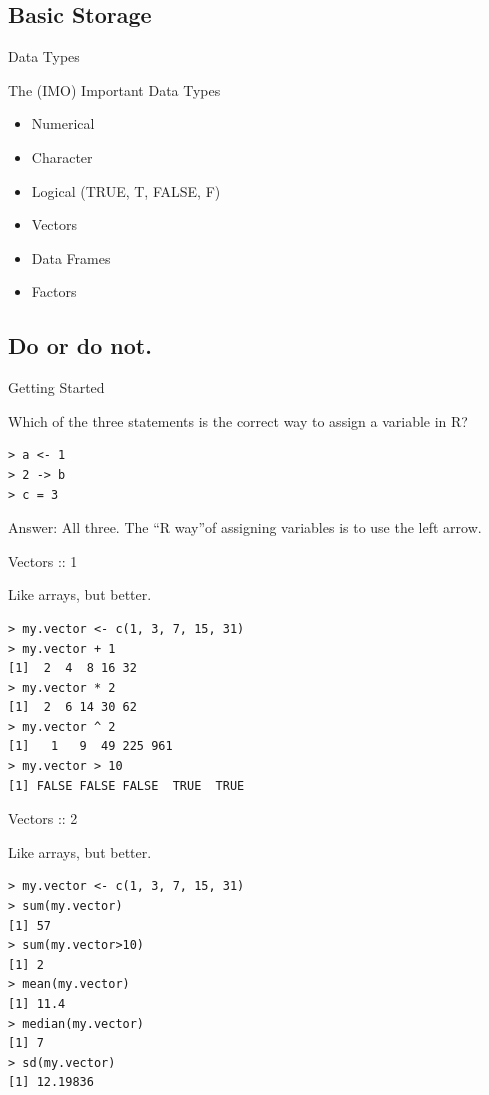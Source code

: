\documentclass{beamer}
\begin{document}
\subsection{Basic Storage}

\begin{frame}{Data Types}

     The (IMO) Important Data Types

     \begin{itemize}
        \item Numerical
        \item Character
        \item Logical (TRUE, T, FALSE, F)
        \item Vectors
        \item Data Frames
        \item Factors
    \end{itemize}
\end{frame}

\subsection{Do or do not.}

\begin{frame}[fragile]{Getting Started}

Which of the three statements is the correct way to assign a variable in R?

\begin{verbatim}
> a <- 1
> 2 -> b
> c = 3
\end{verbatim}

Answer: All three. The ``R way''\texttrademark of assigning variables is to use the left arrow.

\end{frame}

\begin{frame}[fragile]{Vectors :: 1}

Like arrays, but better.

\begin{verbatim}
> my.vector <- c(1, 3, 7, 15, 31)
> my.vector + 1
[1]  2  4  8 16 32
> my.vector * 2
[1]  2  6 14 30 62
> my.vector ^ 2
[1]   1   9  49 225 961
> my.vector > 10
[1] FALSE FALSE FALSE  TRUE  TRUE
\end{verbatim}

\end{frame}

\begin{frame}[fragile]{Vectors :: 2}

Like arrays, but better.

\begin{verbatim}
> my.vector <- c(1, 3, 7, 15, 31)
> sum(my.vector)
[1] 57
> sum(my.vector>10)
[1] 2
> mean(my.vector)
[1] 11.4
> median(my.vector)
[1] 7
> sd(my.vector)
[1] 12.19836
\end{verbatim}

\end{frame}
\end{document}

